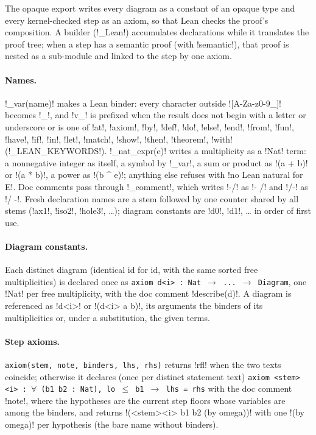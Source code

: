 The opaque export writes every diagram as a constant of an opaque type and every kernel-checked step as an axiom, so that Lean checks the proof's composition. A builder (\py!_Lean!) accumulates declarations while it translates the proof tree; when a step has a semantic proof (with \code!semantic!), that proof is nested as a sub-module and linked to the step by one axiom.

\paragraph{Names.} \py!_var(name)! makes a Lean binder: every character outside \code![A-Za-z0-9_]! becomes \code!_!, and \code!v_! is prefixed when the result does not begin with a letter or underscore or is one of \code!at!, \code!axiom!, \code!by!, \code!def!, \code!do!, \code!else!, \code!end!, \code!from!, \code!fun!, \code!have!, \code!if!, \code!in!, \code!let!, \code!match!, \code!show!, \code!then!, \code!theorem!, \code!with! (\py!_LEAN_KEYWORDS!). \py!_nat_expr(e)! writes a multiplicity as a \lean!Nat! term: a nonnegative integer as itself, a symbol by \py!_var!, a sum or product as \code!(a + b)! or \code!(a * b)!, a power as \code!(b ^ e)!; anything else refuses with \code!no Lean natural for E!. Doc comments pass through \py!_comment!, which writes \code!-/! as \code!- /! and \code!/-! as \code!/ -!. Fresh declaration names are a stem followed by one counter shared by all stems (\code!ax1!, \code!iso2!, \code!hole3!, \ldots); diagram constants are \code!d0!, \code!d1!, \ldots{} in order of first use.

\paragraph{Diagram constants.} Each distinct diagram (identical id for id, with the same sorted free multiplicities) is declared once as \texttt{axiom d<i> : Nat $\to$ .\allowbreak{}.\allowbreak{}.\allowbreak{} $\to$ Diagram}, one \lean!Nat! per free multiplicity, with the doc comment \code!describe(d)!. A diagram is referenced as \code!d<i>! or \code!(d<i> a b)!, its arguments the binders of its multiplicities or, under a substitution, the given terms.

\paragraph{Step axioms.} \texttt{axiom(\allowbreak{}stem,\allowbreak{} note,\allowbreak{} binders,\allowbreak{} lhs,\allowbreak{} rhs)} returns \lean!rfl! when the two texts coincide; otherwise it declares (once per distinct statement text) \texttt{axiom <stem><i> : $\forall$ (\allowbreak{}b1 b2 : Nat),\allowbreak{} lo $\le$ b1 $\to$ lhs = rhs} with the doc comment \code!note!, where the hypotheses are the current step floors whose variables are among the binders, and returns \code!(<stem><i> b1 b2 (by omega))! with one \code!(by omega)! per hypothesis (the bare name without binders).


